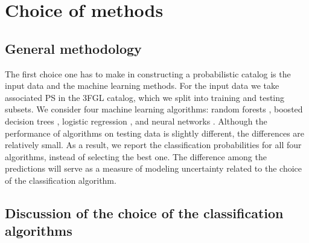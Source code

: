 \section{Choice of methods}

\subsection{General methodology}

The first choice one has to make in constructing a probabilistic catalog is the input data and the machine learning methods.
For the input data we take associated PS in the 3FGL catalog, which we split into training and testing subsets.
We consider four machine learning algorithms: random forests \citep[RF,][]{709601, Breiman:2001hzm}, 
boosted decision trees \citep[BDT,][]{friedman2001},  
logistic regression \citep[LR,][]{cox1958}, 
and neural networks \citep[NN,][]{Hopfield:1982pe}.
Although the performance of algorithms on testing data is slightly different, the differences are relatively small.
As a result, we report the classification probabilities for all four algorithms, instead of selecting the best one.
The difference among the predictions will serve as a measure of modeling uncertainty related to the choice of the classification algorithm.

\subsection{Discussion of the choice of the classification algorithms}

